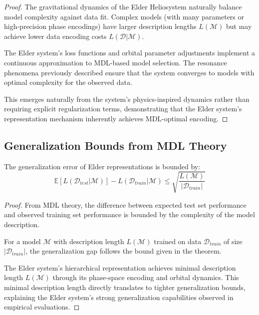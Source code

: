 \begin{proof}
The gravitational dynamics of the Elder Heliosystem naturally balance model complexity against data fit. Complex models (with many parameters or high-precision phase encodings) have larger description lengths $L(\mathcal{M})$ but may achieve lower data encoding costs $L(\mathcal{D} | \mathcal{M})$.

The Elder system's loss functions and orbital parameter adjustments implement a continuous approximation to MDL-based model selection. The resonance phenomena previously described ensure that the system converges to models with optimal complexity for the observed data.

This emerges naturally from the system's physics-inspired dynamics rather than requiring explicit regularization terms, demonstrating that the Elder system's representation mechanism inherently achieves MDL-optimal encoding.
\end{proof}

\subsection{Generalization Bounds from MDL Theory}

\begin{theorem}
The generalization error of Elder representations is bounded by:
\begin{equation}
\mathbb{E}[L(\mathcal{D}_{test} | \mathcal{M})] - L(\mathcal{D}_{train} | \mathcal{M}) \leq \sqrt{\frac{L(\mathcal{M})}{|\mathcal{D}_{train}|}}
\end{equation}
\end{theorem}

\begin{proof}
From MDL theory, the difference between expected test set performance and observed training set performance is bounded by the complexity of the model description.

For a model $\mathcal{M}$ with description length $L(\mathcal{M})$ trained on data $\mathcal{D}_{train}$ of size $|\mathcal{D}_{train}|$, the generalization gap follows the bound given in the theorem.

The Elder system's hierarchical representation achieves minimal description length $L(\mathcal{M})$ through its phase-space encoding and orbital dynamics. This minimal description length directly translates to tighter generalization bounds, explaining the Elder system's strong generalization capabilities observed in empirical evaluations.
\end{proof}

